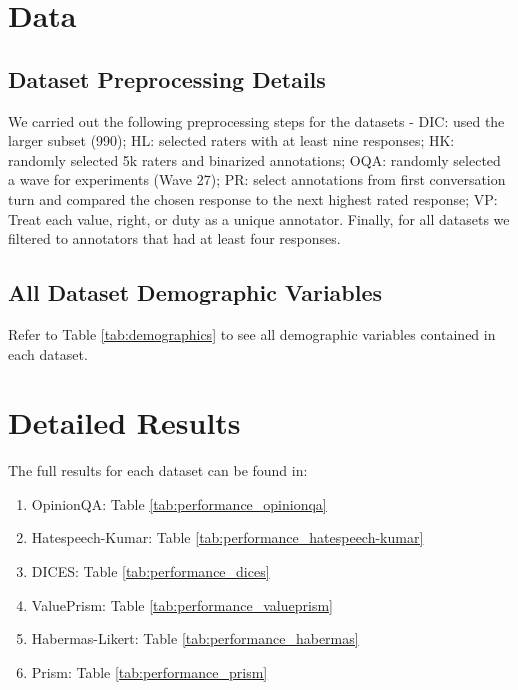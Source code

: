 \documentclass[11pt]{article}
\begin{document}
\section{Data}
\label{app:data}
\subsection{Dataset Preprocessing Details}
\label{app:datasetpreprocessing}

We carried out the following preprocessing steps for the datasets -
DIC: used the larger subset (990);
HL: selected raters with at least nine responses;
HK: randomly selected 5k raters and binarized annotations;
OQA: randomly selected a wave for experiments (Wave 27);
PR: select annotations from first conversation turn and compared the chosen response to the next highest rated response;
VP: Treat each value, right, or duty as a unique annotator.
Finally, for all datasets we filtered to annotators that had at least four responses.

\subsection{All Dataset Demographic Variables}
Refer to Table \ref{tab:demographics} to see all demographic variables contained in each dataset.

\newpage
\section{Detailed Results}
\label{app:bigresults}

The full results for each dataset can be found in:
\begin{enumerate}
\item OpinionQA: Table \ref{tab:performance_opinionqa}
\item Hatespeech-Kumar: Table \ref{tab:performance_hatespeech-kumar}
\item DICES: Table \ref{tab:performance_dices}
\item ValuePrism: Table \ref{tab:performance_valueprism}
\item Habermas-Likert: Table \ref{tab:performance_habermas}
\item Prism: Table \ref{tab:performance_prism}
\end{enumerate}
\end{document}
